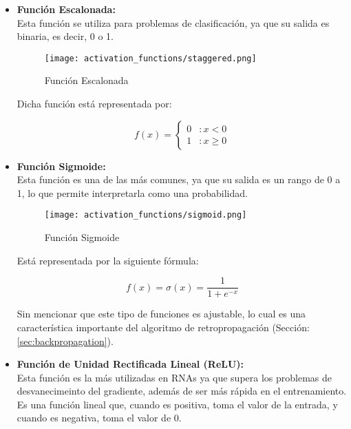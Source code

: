         \begin{itemize}
            \item \textbf{Función Escalonada:} \\
                Esta función se utiliza para problemas de clasificación, ya que su salida es binaria, es decir, 0 o 1.
                \begin{figure}[H]
                    \centering
                    \texttt{[image: activation\_functions/staggered.png]}
                    \caption{Función Escalonada}
                    \label{fig:step_function}
                \end{figure}

                Dicha función está representada por:

                \[
                f(x) = \left\{ \begin{array}{lr} 
                0 & : x < 0 \\
                1 & : x \ge 0 
                \end{array} \right.
                \]
            
            \item \textbf{Función Sigmoide:} \\
                Esta función es una de las más comunes, ya que su salida es un rango de 0 a 1, lo que permite interpretarla como una probabilidad.
                \begin{figure}[H]
                    \centering
                    \texttt{[image: activation\_functions/sigmoid.png]}
                    \caption{Función Sigmoide}
                    \label{fig:sigmoid_function}
                \end{figure}

                Está representada por la siguiente fórmula:

                \[
                f(x) = \sigma(x) =  \frac{1}{1 + e^{-x}}
                \]

                Sin mencionar que este tipo de funciones es ajustable, lo cual es una característica importante del algoritmo de retropropagación (Sección: \ref{sec:backpropagation}).
            
            \item \textbf{Función de Unidad Rectificada Lineal (ReLU):} \\
                Esta función es la más utilizadas en RNAs ya que supera los problemas de desvanecimeinto del gradiente, además de ser más rápida en el entrenamiento. \\
                Es una función lineal que, cuando es positiva, toma el valor de la entrada, y cuando es negativa, toma el valor de 0.


\end{itemize}
